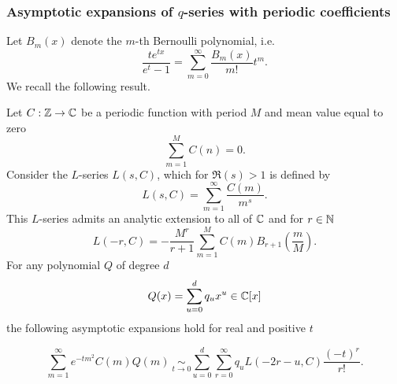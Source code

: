 \subsubsection{Asymptotic expansions of $q$-series with periodic coefficients}

Let $B_m(x)$ denote the $m$-th Bernoulli polynomial, i.e.
\begin{equation} \label{def:Bernoulli}
\frac{te^{tx}}{e^t-1}= \sum_{m=0}^{\infty} \frac{B_m(x)}{m!} t^m.
\end{equation} We recall the following result.

\begin{proposition} \label{pro:ZagiersProposition}
	Let $C: \mathbb{Z} \rightarrow \mathbb{C}$ be a periodic function with period $M$ and mean value equal to zero
	\begin{equation}
	\sum_{m=1}^M C(n)=0.
	\end{equation}
	Consider the $L$-series $L(s,C)$, which for $\Re(s)>1$ is defined by 
	\begin{equation} \label{eq:Lseries}
	L(s,C)= \sum_{m=1}^{\infty} \frac{C(m)}{m^s}.
	\end{equation} 
	This $L$-series admits an analytic extension to all of $\mathbb{C}$ and for $r \in \mathbb{N}$ 
	\begin{equation} \label{eq:Lseriesr}
	L(-r,C)= -\frac{M^r}{r+1} \sum_{m=1}^M C(m) B_{r+1}\left(\frac{m}{M}\right).
	\end{equation}
	For any polynomial $Q$ of degree $d$
	$$Q(x)=\sum_{u=0}^d q_{u} x^u \in \mathbb{C}[x]$$ the following asymptotic expansions hold for real and positive $t$
\end{proposition}
	
	\begin{equation} \label{eq:qseriesexpansion}
	\sum_{m=1}^{\infty} e^{-tm^2} C(m) Q(m) \ \underset{t \rightarrow 0}{\sim}  \sum_{u=0}^d \sum_{r=0}^{\infty} q_u L(-2r-u,C) \frac{(-t)^r}{r!}.
 	\end{equation}
	
